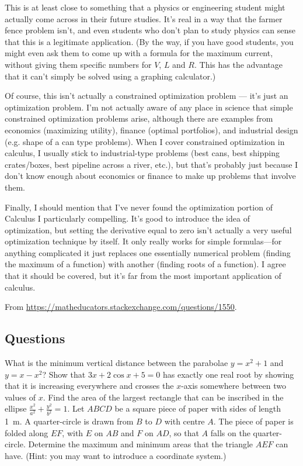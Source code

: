 This is at least close to something that a physics or engineering student might actually come across in their future studies. It's real in a way that the farmer fence problem isn't, and even students who don't plan to study physics can sense that this is a legitimate application. (By the way, if you have good students, you might even ask them to come up with a formula for the maximum current, without giving them specific numbers for $ V $, $ L $ and $ R $. This has the advantage that it can't simply be solved using a graphing calculator.)

Of course, this isn't actually a constrained optimization problem --- it's just an optimization problem. I'm not actually aware of any place in science that simple constrained optimization problems arise, although there are examples from economics (maximizing utility), finance (optimal portfolios), and industrial design (e.g. shape of a can type problems). When I cover constrained optimization in calculus, I usually stick to industrial-type problems (best cans, best shipping crates/boxes, best pipeline across a river, etc.), but that's probably just because I don't know enough about economics or finance to make up problems that involve them.

Finally, I should mention that I've never found the optimization portion of Calculus I particularly compelling. It's good to introduce the idea of optimization, but setting the derivative equal to zero isn't actually a very useful optimization technique by itself. It only really works for simple formulas—for anything complicated it just replaces one essentially numerical problem (finding the maximum of a function) with another (finding roots of a function). I agree that it should be covered, but it's far from the most important application of calculus.

\begin{flushright}
  From \url{https://matheducators.stackexchange.com/questions/1550}.
\end{flushright}

\subsection*{Questions}
\begin{questions}
  \question What is the minimum vertical distance between the parabolae $ y = x^2 + 1 $ and $ y = x - x^2 $?
  \question Show that $ 3x + 2\cos x + 5 = 0 $ has exactly one real root by showing that it
            is increasing everywhere and crosses the $ x$-axis somewhere between two values of $ x $.
  \question Find the area of the largest rectangle that can be inscribed in the ellipse $ \frac{x^2}{a^2} + \frac{y^2}{b^2} = 1 $.
  \question Let $ ABCD $ be a square piece of paper with sides of length \SI{1}{\metre}. A
            quarter-circle is drawn from $ B $ to $ D $ with centre $ A $. The piece of paper is folded along $ EF $, with $ E $ on $ AB $
            and $ F $ on $ AD $, so that $ A $ falls on the quarter-circle. Determine the maximum and minimum areas that the triangle $ AEF $
            can have. (Hint: you may want to introduce a coordinate system.)
\end{questions}

